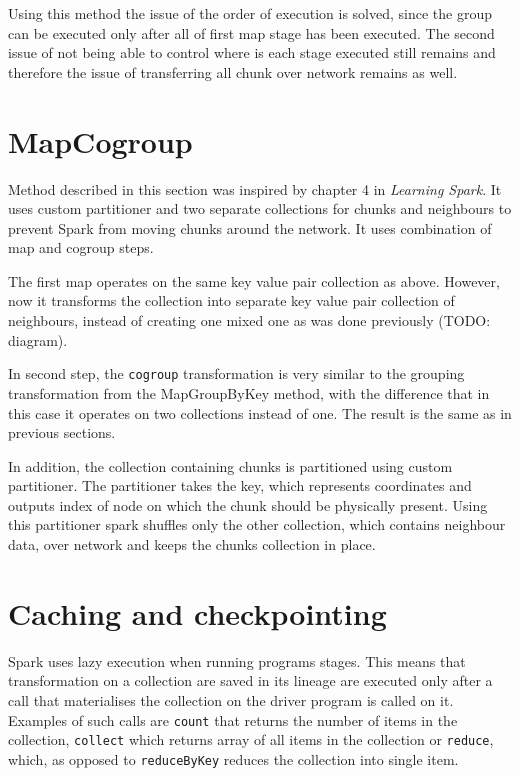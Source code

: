\documentclass{l4proj}
\begin{document}
Using this method the issue of the order of execution is solved, since the group
can be executed only after all of first map stage has been executed. The second issue
of not being able to control where is each stage executed still remains and therefore
the issue of transferring all chunk over network remains as well.

\section{MapCogroup}

Method described in this section was inspired by chapter 4 in \textit{Learning Spark}\cite{learning_spark}.
It uses custom partitioner and two separate collections for chunks and neighbours
to prevent Spark from moving chunks around the network. It uses combination
of map and cogroup steps.

The first map operates on the same key value pair collection as above. However,
now it transforms the collection into separate key value pair collection of neighbours,
instead of creating one mixed one as was done previously (TODO: diagram).

In second step, the \texttt{cogroup} transformation is very similar to the grouping transformation
from the MapGroupByKey method, with the difference that in this case it operates on two collections 
instead of one. The result is the same as in previous sections.

In addition, the collection containing chunks is partitioned using custom partitioner.
The partitioner takes the key, which represents coordinates and outputs index of node
on which the chunk should be physically present. Using this partitioner spark
shuffles only the other collection, which contains neighbour data, over network and
keeps the chunks collection in place.

\section{Caching and checkpointing}

Spark uses lazy execution when running programs stages. This means that transformation
on a collection are saved in its lineage are executed only after a call
that materialises the collection on the driver program is called on it. Examples of such calls are
\texttt{count} that returns the number of items in the collection, \texttt{collect}
which returns array of all items in the collection or \texttt{reduce}, which, as opposed
to \texttt{reduceByKey} reduces the collection into single item.
\end{document}
